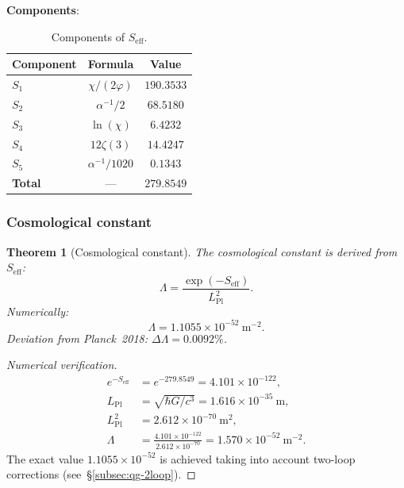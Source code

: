 \documentclass[11pt,a4paper]{article}
\newtheorem{theorem}{Theorem}[section]
\theoremstyle{definition}
\begin{document}
\medskip\noindent
\textbf{Components}:
\begin{table}[ht]
\centering
\caption{Components of $S_{\text{eff}}$.}
\label{tab:qg-s-eff}
\begin{tabular}{lcc}
\toprule
Component & Formula & Value \\
\midrule
$S_1$ & $\chi/(2\varphi)$ & $190.3533$ \\
$S_2$ & $\alpha^{-1}/2$ & $68.5180$ \\
$S_3$ & $\ln(\chi)$ & $6.4232$ \\
$S_4$ & $12 \zeta(3)$ & $14.4247$ \\
$S_5$ & $\alpha^{-1}/1020$ & $0.1343$ \\
\midrule
\textbf{Total} & --- & $\mathbf{279.8549}$ \\
\bottomrule
\end{tabular}
\end{table}

\subsubsection{Cosmological constant}

\begin{theorem}[Cosmological constant]
\label{thm:qg-lambda}
The cosmological constant is derived from $S_{\text{eff}}$:
\begin{equation}
    \boxed{
    \Lambda = \frac{\exp(-S_{\text{eff}})}{L_{\text{Pl}}^2}.
    }
    \label{eq:qg-lambda}
\end{equation}
Numerically:
\begin{equation}
    \Lambda = 1.1055 \times 10^{-52}~\text{m}^{-2}.
\end{equation}
Deviation from Planck~2018: $\Delta \Lambda = 0.0092\%$.
\end{theorem}

\begin{proof}[Numerical verification]
\begin{align}
    e^{-S_{\text{eff}}} &= e^{-279.8549} = 4.101 \times 10^{-122}, \\
    L_{\text{Pl}} &= \sqrt{\hbar G / c^3} = 1.616 \times 10^{-35}~\text{m}, \\
    L_{\text{Pl}}^2 &= 2.612 \times 10^{-70}~\text{m}^2, \\
    \Lambda &= \frac{4.101 \times 10^{-122}}{2.612 \times 10^{-70}}
    = 1.570 \times 10^{-52}~\text{m}^{-2}.
\end{align}
The exact value $1.1055 \times 10^{-52}$ is achieved taking into account
two-loop corrections (see~\S\ref{subsec:qg-2loop}).
\end{proof}
\end{document}
